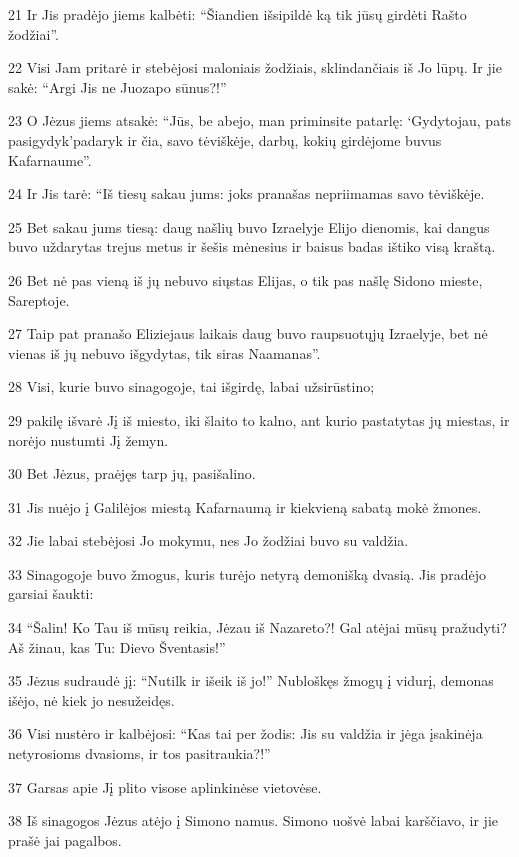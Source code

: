 \par 21 Ir Jis pradėjo jiems kalbėti: “Šiandien išsipildė ką tik jūsų girdėti Rašto žodžiai”. 
\par 22 Visi Jam pritarė ir stebėjosi maloniais žodžiais, sklindančiais iš Jo lūpų. Ir jie sakė: “Argi Jis ne Juozapo sūnus?!” 
\par 23 O Jėzus jiems atsakė: “Jūs, be abejo, man priminsite patarlę: ‘Gydytojau, pats pasigydyk’­padaryk ir čia, savo tėviškėje, darbų, kokių girdėjome buvus Kafarnaume”. 
\par 24 Ir Jis tarė: “Iš tiesų sakau jums: joks pranašas nepriimamas savo tėviškėje. 
\par 25 Bet sakau jums tiesą: daug našlių buvo Izraelyje Elijo dienomis, kai dangus buvo uždarytas trejus metus ir šešis mėnesius ir baisus badas ištiko visą kraštą. 
\par 26 Bet nė pas vieną iš jų nebuvo siųstas Elijas, o tik pas našlę Sidono mieste, Sareptoje. 
\par 27 Taip pat pranašo Eliziejaus laikais daug buvo raupsuotųjų Izraelyje, bet nė vienas iš jų nebuvo išgydytas, tik siras Naamanas”. 
\par 28 Visi, kurie buvo sinagogoje, tai išgirdę, labai užsirūstino; 
\par 29 pakilę išvarė Jį iš miesto, iki šlaito to kalno, ant kurio pastatytas jų miestas, ir norėjo nustumti Jį žemyn. 
\par 30 Bet Jėzus, praėjęs tarp jų, pasišalino. 
\par 31 Jis nuėjo į Galilėjos miestą Kafarnaumą ir kiekvieną sabatą mokė žmones. 
\par 32 Jie labai stebėjosi Jo mokymu, nes Jo žodžiai buvo su valdžia. 
\par 33 Sinagogoje buvo žmogus, kuris turėjo netyrą demonišką dvasią. Jis pradėjo garsiai šaukti: 
\par 34 “Šalin! Ko Tau iš mūsų reikia, Jėzau iš Nazareto?! Gal atėjai mūsų pražudyti? Aš žinau, kas Tu: Dievo Šventasis!” 
\par 35 Jėzus sudraudė jį: “Nutilk ir išeik iš jo!” Nubloškęs žmogų į vidurį, demonas išėjo, nė kiek jo nesužeidęs. 
\par 36 Visi nustėro ir kalbėjosi: “Kas tai per žodis: Jis su valdžia ir jėga įsakinėja netyrosioms dvasioms, ir tos pasitraukia?!” 
\par 37 Garsas apie Jį plito visose aplinkinėse vietovėse. 
\par 38 Iš sinagogos Jėzus atėjo į Simono namus. Simono uošvė labai karščiavo, ir jie prašė jai pagalbos. 

